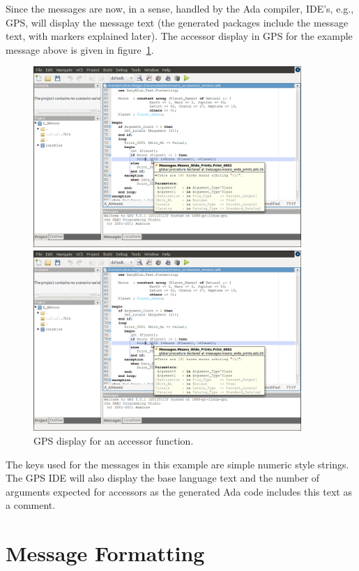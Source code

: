 Since the messages are now, in a sense, handled by the Ada compiler, IDE's,
e.g., GPS, will display the message text (the generated packages include the
message text, with markers explained later).  The accessor display in GPS
for the example message above is given in figure~\ref{fig:moons-accessor}.
\begin{figure}
\begin{center}
\begin{latexonly}
    \includegraphics[angle=90,width=4in]{images/gps-accessor.png}
\end{latexonly}
\begin{htmlonly}
    \includegraphics[width=4in]{images/gps-accessor.png}
\end{htmlonly}
\end{center}
\caption{GPS display for an accessor function.}
\label{fig:moons-accessor}
\end{figure}
The keys used for the messages in this example are simple numeric style
strings.  The GPS IDE will also display the base language text and
the number of arguments expected for accessors as the generated Ada code
includes this text as a comment.

\section{Message Formatting}

